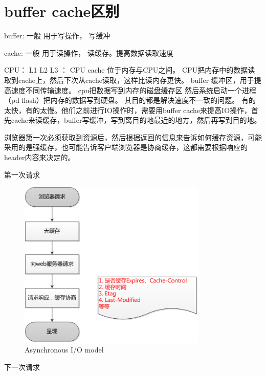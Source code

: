 \section{buffer cache区别}

buffer: 一般 用于写操作， 写缓冲

cache:  一般 用于读操作， 读缓存。提高数据读取速度

CPU： L1 L2 L3  ： CPU cache 位于内存与CPU之间。 CPU把内存中的数据读取到cache上，然后下次从cache读取，这样比读内存更快。
buffer 缓冲区，用于提高速度不同传输速度。 cpu把数据写到内存的磁盘缓存区 然后系统启动一个进程（pd flash）把内存的数据写到硬盘。
其目的都是解决速度不一致的问题。 有的太快，有的太慢。他们之前进行IO操作时，需要用buffer cache来提高IO操作，首先cache来读缓存，buffer写缓冲，写到离目的地最近的地方，然后再写到目的地。


浏览器第一次必须获取到资源后，然后根据返回的信息来告诉如何缓存资源，可能采用的是强缓存，也可能告诉客户端浏览器是协商缓存，这都需要根据响应的header内容来决定的。

第一次请求

\begin{figure}[!ht]
    \centering    
     \caption{\label{Fig:async} Asynchronous I/O model}
    \includegraphics[width=0.8\textwidth]{./images/firstRequest.png}  
\end{figure}

下一次请求

